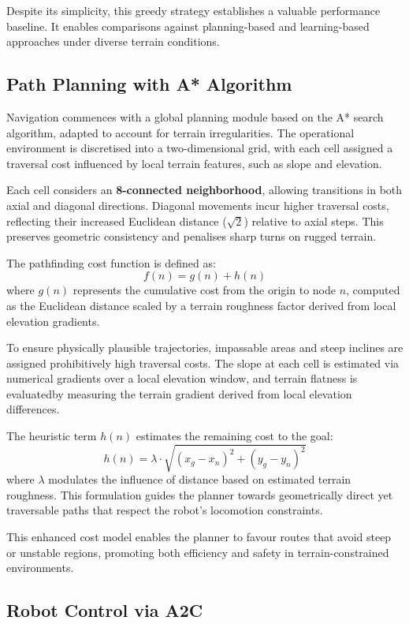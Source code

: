 \documentclass[11pt,twocolumn]{article}
\begin{document}
Despite its simplicity, this greedy strategy establishes a valuable performance baseline. It enables comparisons against planning-based and learning-based approaches under diverse terrain conditions.

\subsection{Path Planning with A* Algorithm}

Navigation commences with a global planning module based on the A* search algorithm, adapted to account for terrain irregularities. The operational environment is discretised into a two-dimensional grid, with each cell assigned a traversal cost influenced by local terrain features, such as slope and elevation.

Each cell considers an \textbf{8-connected neighborhood}, allowing transitions in both axial and diagonal directions. Diagonal movements incur higher traversal costs, reflecting their increased Euclidean distance ($\sqrt{2}$) relative to axial steps. This preserves geometric consistency and penalises sharp turns on rugged terrain.

The pathfinding cost function is defined as:
\[
f(n) = g(n) + h(n)
\]
where $g(n)$ represents the cumulative cost from the origin to node $n$, computed as the Euclidean distance scaled by a terrain roughness factor derived from local elevation gradients. 

To ensure physically plausible trajectories, impassable areas and steep inclines are assigned prohibitively high traversal costs. The slope at each cell is estimated via numerical gradients over a local elevation window, and terrain flatness is evaluatedby measuring the terrain gradient derived from local elevation differences.

The heuristic term $h(n)$ estimates the remaining cost to the goal:
\[
h(n) = \lambda \cdot \sqrt{(x_g - x_n)^2 + (y_g - y_n)^2}
\]
where $\lambda$ modulates the influence of distance based on estimated terrain roughness. This formulation guides the planner towards geometrically direct yet traversable paths that respect the robot’s locomotion constraints.

This enhanced cost model enables the planner to favour routes that avoid steep or unstable regions, promoting both efficiency and safety in terrain-constrained environments.
\subsection{Robot Control via A2C}
\end{document}
